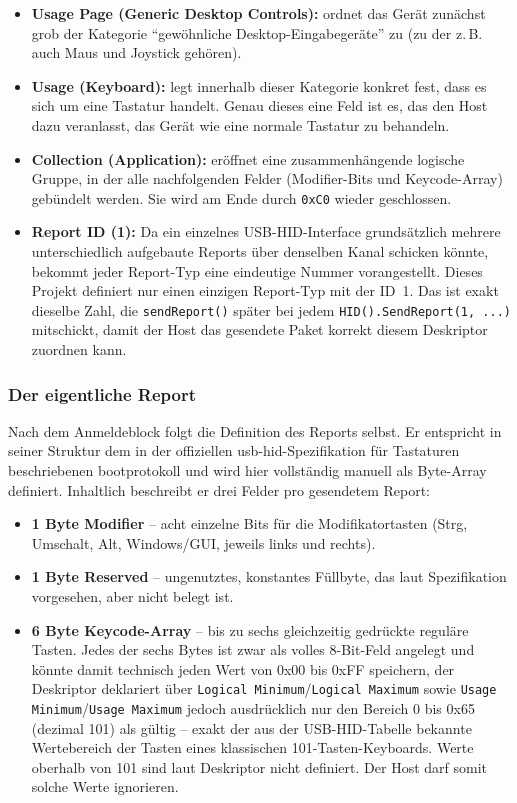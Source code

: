\documentclass{article}
\begin{document}
\begin{itemize}
    \item \textbf{Usage Page (Generic Desktop Controls):} ordnet das Gerät zunächst grob der Kategorie \enquote{gewöhnliche Desktop-Eingabegeräte} zu (zu der z.\,B. auch Maus und Joystick gehören).
    \item \textbf{Usage (Keyboard):} legt innerhalb dieser Kategorie konkret fest, dass es sich um eine Tastatur handelt. Genau dieses eine Feld ist es, das den Host dazu veranlasst, das Gerät wie eine normale Tastatur zu behandeln.
    \item \textbf{Collection (Application):} eröffnet eine zusammenhängende logische Gruppe, in der alle nachfolgenden Felder (Modifier-Bits und Keycode-Array) gebündelt werden. Sie wird am Ende durch \texttt{0xC0} wieder geschlossen.
    \item \textbf{Report ID (1):} Da ein einzelnes USB-HID-Interface grundsätzlich mehrere unterschiedlich aufgebaute Reports über denselben Kanal schicken könnte, bekommt jeder Report-Typ eine eindeutige Nummer vorangestellt. Dieses Projekt definiert nur einen einzigen Report-Typ mit der ID~1. Das ist exakt dieselbe Zahl, die \texttt{sendReport()} später bei jedem \texttt{HID().SendReport(1, ...)} mitschickt, damit der Host das gesendete Paket korrekt diesem Deskriptor zuordnen kann.
\end{itemize}

\subsubsection{Der eigentliche Report}
Nach dem Anmeldeblock folgt die Definition des Reports selbst. Er entspricht in seiner Struktur dem in der offiziellen \gls{usb-hid}-Spezifikation für Tastaturen beschriebenen \gls{bootprotokoll} und wird hier vollständig manuell als Byte-Array definiert. Inhaltlich beschreibt er drei Felder pro gesendetem Report:

\begin{itemize}
    \item \textbf{1 Byte Modifier} -- acht einzelne Bits für die Modifikatortasten (Strg, Umschalt, Alt, Windows/GUI, jeweils links und rechts).
    \item \textbf{1 Byte Reserved} -- ungenutztes, konstantes Füllbyte, das laut Spezifikation vorgesehen, aber nicht belegt ist.
    \item \textbf{6 Byte Keycode-Array} -- bis zu sechs gleichzeitig gedrückte reguläre Tasten. Jedes der sechs Bytes ist zwar als volles 8-Bit-Feld angelegt und könnte damit technisch jeden Wert von 0x00 bis 0xFF speichern, der Deskriptor deklariert über \texttt{Logical Minimum}/\texttt{Logical Maximum} sowie \texttt{Usage Minimum}/\texttt{Usage Maximum} jedoch ausdrücklich nur den Bereich 0 bis 0x65 (dezimal 101) als gültig -- exakt der aus der USB-HID-Tabelle bekannte Wertebereich der Tasten eines klassischen 101-Tasten-Keyboards. Werte oberhalb von 101 sind laut Deskriptor nicht definiert. Der Host darf somit solche Werte ignorieren.
\end{itemize}
\end{document}
